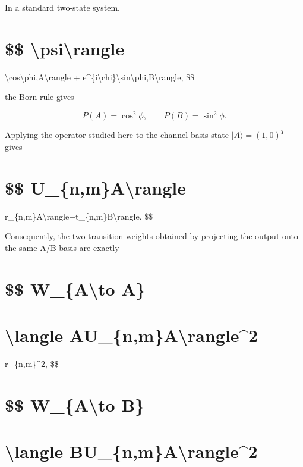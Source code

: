 \documentclass[
  a4paper,
  10pt]{article}
\begin{document}
In a standard two-state system,

\section{\$\$
\textbar\textbackslash psi\textbackslash rangle}\label{-psirangle-1}

\textbackslash cos\textbackslash phi,\textbar A\textbackslash rangle +
e\^{}\{i\textbackslash chi\}\textbackslash sin\textbackslash phi,\textbar B\textbackslash rangle,
\$\$

the Born rule gives

\[
P(A)=\cos^2\phi,
\qquad
P(B)=\sin^2\phi.
\]

Applying the operator studied here to the channel-basis state
\(|A\rangle=(1,0)^T\) gives

\section{\$\$
U\_\{n,m\}\textbar A\textbackslash rangle}\label{-u_nmarangle}

r\_\{n,m\}\textbar A\textbackslash rangle+t\_\{n,m\}\textbar B\textbackslash rangle.
\$\$

Consequently, the two transition weights obtained by projecting the
output onto the same A/B basis are exactly

\section{\$\$ W\_\{A\textbackslash to A\}}\label{-w_ato-a}

\section{\textbar\textbackslash langle
A\textbar U\_\{n,m\}\textbar A\textbackslash rangle\textbar\^{}2}\label{langle-au_nmarangle2}

\textbar r\_\{n,m\}\textbar\^{}2, \$\$

\section{\$\$ W\_\{A\textbackslash to B\}}\label{-w_ato-b}

\section{\textbar\textbackslash langle
B\textbar U\_\{n,m\}\textbar A\textbackslash rangle\textbar\^{}2}\label{langle-bu_nmarangle2}
\end{document}
